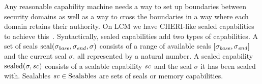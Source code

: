 \documentclass[acmsmall,review,showframe]{acmart}\settopmatter{printfolios=true,printccs=false,printacmref=false}
\renewcommand{\SealableCaps}{\shareddom{Sealables}}
\newcommand{\trgcm}{\textsc{LCM}}
\begin{document}
Any reasonable capability machine needs a way to set up boundaries between security domains as well as a way to cross the boundaries in a way where each domain retains their authority.
On \trgcm{} we have CHERI-like sealed capabilities to achieve this~\cite{watson_cheri:_2015}.
Syntactically, sealed capabilities add two types of capabilities.
A set of seals $\mathrm{seal}(\sigma_{\mathit{base}},\sigma_{\mathit{end}},\sigma)$ consists of a range of available seals $[\sigma_{\mathit{base}},\sigma_{\mathit{end}}]$ and the current seal $\sigma$, all represented by a natural number.
A sealed capability $\mathrm{sealed}(\sigma,\mathit{sc})$ consists of a sealable capability $\mathit{sc}$ and the seal $\sigma$ it has been sealed with.
Sealables $\vsc \in \SealableCaps$ are sets of seals or memory capabilities.
\end{document}
